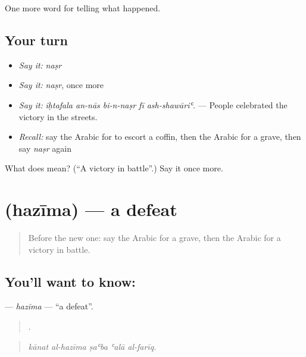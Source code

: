 \begin{grammarlens}[title={What you've built}]
One more word for telling what happened.
\end{grammarlens}

\subsection*{Your turn}
\begin{itemize}
\raggedright
  \item \emph{Say it:} \emph{naṣr}
  \item \emph{Say it:} \emph{naṣr}, once more
  \item \emph{Say it:} \emph{iḥtafala an-nās bi-n-naṣr fī ash-shawāriʿ.} — People celebrated the victory in the streets.
  \item \emph{Recall:} say the Arabic for to escort a coffin, then the Arabic for a grave, then say \emph{naṣr} again
\end{itemize}

\begin{tcolorbox}[breakable,colback=teal!4,colframe=teal!35!black,title={Before you move on}]
What does  mean? (\textquotedblleft{}A victory in battle\textquotedblright{}.) Say it once more.
\end{tcolorbox}
\section[\texorpdfstring{\ar{هزيمة} (hazīma)}{هزيمة (hazīma)}]{ (hazīma) — a defeat}

\label{lesson:AR-C315-hazima}



\begin{quote}
Before the new one: say the Arabic for a grave, then the Arabic for a victory in battle.
\end{quote}

\subsection*{You'll want to know: }
\textbf{} — \emph{hazīma} — \textquotedblleft{}a defeat\textquotedblright{}.

\begin{quote}
    .
\end{quote}

\begin{quote}
\emph{kānat al-hazīma ṣaʿba ʿalā al-farīq.}
\end{quote}

